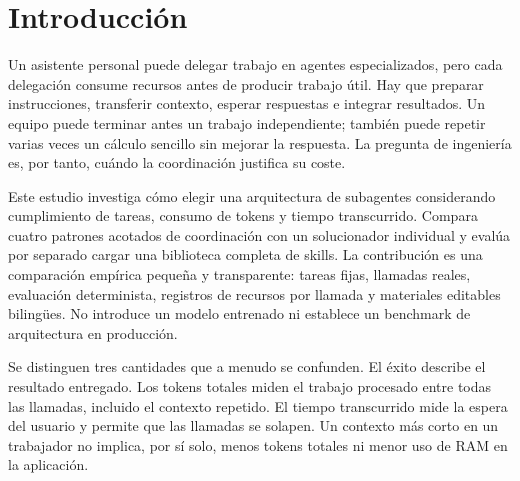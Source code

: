 \documentclass[11pt,a4paper]{article}
\begin{document}

\section{Introducción}
Un asistente personal puede delegar trabajo en agentes especializados, pero cada delegación consume recursos antes de producir trabajo útil. Hay que preparar instrucciones, transferir contexto, esperar respuestas e integrar resultados. Un equipo puede terminar antes un trabajo independiente; también puede repetir varias veces un cálculo sencillo sin mejorar la respuesta. La pregunta de ingeniería es, por tanto, cuándo la coordinación justifica su coste.

Este estudio investiga cómo elegir una arquitectura de subagentes considerando cumplimiento de tareas, consumo de tokens y tiempo transcurrido. Compara cuatro patrones acotados de coordinación con un solucionador individual y evalúa por separado cargar una biblioteca completa de skills. La contribución es una comparación empírica pequeña y transparente: tareas fijas, llamadas reales, evaluación determinista, registros de recursos por llamada y materiales editables bilingües. No introduce un modelo entrenado ni establece un benchmark de arquitectura en producción.

Se distinguen tres cantidades que a menudo se confunden. El éxito describe el resultado entregado. Los tokens totales miden el trabajo procesado entre todas las llamadas, incluido el contexto repetido. El tiempo transcurrido mide la espera del usuario y permite que las llamadas se solapen. Un contexto más corto en un trabajador no implica, por sí solo, menos tokens totales ni menor uso de RAM en la aplicación.





\end{document}
